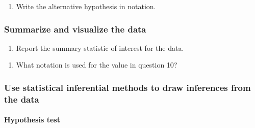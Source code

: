 \documentclass[
]{report}
\providecommand{\tightlist}{%
  \setlength{\itemsep}{0pt}\setlength{\parskip}{0pt}}
\begin{document}
\vspace{1in}

\begin{enumerate}
\def\labelenumi{\arabic{enumi}.}
\setcounter{enumi}{8}
\tightlist
\item
  Write the alternative hypothesis in notation.
\end{enumerate}

\vspace{1in}

\hypertarget{summarize-and-visualize-the-data-2}{%
\subsubsection*{Summarize and visualize the data}\label{summarize-and-visualize-the-data-2}}

\begin{enumerate}
\def\labelenumi{\arabic{enumi}.}
\setcounter{enumi}{9}
\tightlist
\item
  Report the summary statistic of interest for the data.
\end{enumerate}

\vspace{0.3in}

\begin{enumerate}
\def\labelenumi{\arabic{enumi}.}
\setcounter{enumi}{10}
\tightlist
\item
  What notation is used for the value in question 10?
\end{enumerate}

\vspace{0.3in}

\hypertarget{use-statistical-inferential-methods-to-draw-inferences-from-the-data}{%
\subsubsection*{Use statistical inferential methods to draw inferences from the data}\label{use-statistical-inferential-methods-to-draw-inferences-from-the-data}}

\hypertarget{hypothesis-test}{%
\paragraph*{Hypothesis test}\label{hypothesis-test}}
\end{document}
